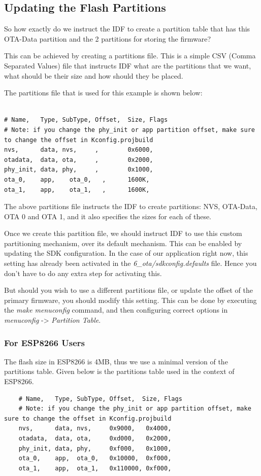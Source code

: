 \documentclass[main.tex]{subfiles}
\begin{document}
\subsection{Updating the Flash Partitions}\label{sec:updating_flash_partitions}
So how exactly do we instruct the IDF to create a partition table that has this OTA-Data partition and the 2 partitions for storing the firmware?

This can be achieved by creating a partitions file. This is a simple CSV (Comma Separated Values) file that instructs IDF what are the partitions that we want, what should be their size and how should they be placed.

The partitions file that is used for this example is shown below:
\begin{verbatim}

# Name,   Type, SubType, Offset,  Size, Flags
# Note: if you change the phy_init or app partition offset, make sure to change the offset in Kconfig.projbuild
nvs,      data, nvs,     ,        0x6000,
otadata,  data, ota,     ,        0x2000,
phy_init, data, phy,     ,        0x1000,
ota_0,    app,    ota_0,   ,      1600K,
ota_1,    app,    ota_1,   ,      1600K,
\end{verbatim}

The above partitions file instructs the IDF to create partitions: NVS, OTA-Data, OTA 0 and OTA 1, and it also specifies the sizes for each of these.

Once we create this partition file, we should instruct IDF to use this custom partitioning mechanism, over its default mechanism. This can be enabled by updating the SDK configuration. In the case of our application right now, this setting has already been activated in the \textit{6\_ota/sdkconfig.defaults} file. Hence you don't have to do any extra step for activating this.

But should you wish to use a different partitions file, or update the offset of the primary firmware, you should modify this setting. This can be done by executing the \textit{make menuconfig} command, and then configuring correct options in \textit{menuconfig} -> \textit{Partition Table}.

\subsubsection{For ESP8266 Users}\label{sec:for_esp8266_users}
The flash size in ESP8266 is 4MB, thus we use a minimal version of the partitions table. Given below is the partitions table used in the context of ESP8266.
\begin{verbatim}
    # Name,   Type, SubType, Offset,  Size, Flags
    # Note: if you change the phy_init or app partition offset, make sure to change the offset in Kconfig.projbuild
    nvs,      data, nvs,     0x9000,   0x4000,
    otadata,  data, ota,     0xd000,   0x2000,
    phy_init, data, phy,     0xf000,   0x1000,
    ota_0,    app,  ota_0,   0x10000,  0xf000,
    ota_1,    app,  ota_1,   0x110000, 0xf000,
\end{verbatim}
\end{document}
